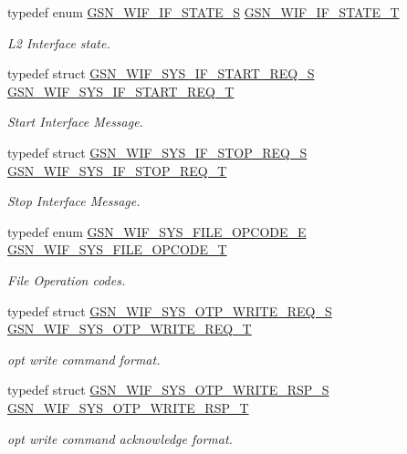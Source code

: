 \begin{DoxyCompactItemize}
typedef enum \hyperlink{a00639_ga5b5ea6b444509449484db8bf22612b98}{GSN\_\-WIF\_\-IF\_\-STATE\_\-S} \hyperlink{a00639_ga7ff7134a0bdba9e91d4edf9cea797de7}{GSN\_\-WIF\_\-IF\_\-STATE\_\-T}
\begin{DoxyCompactList}\small\item\em L2 Interface state. \end{DoxyCompactList}\item 
typedef struct \hyperlink{a00353}{GSN\_\-WIF\_\-SYS\_\-IF\_\-START\_\-REQ\_\-S} \hyperlink{a00639_gae60d074a50101f9b50a01707e3d4f437}{GSN\_\-WIF\_\-SYS\_\-IF\_\-START\_\-REQ\_\-T}
\begin{DoxyCompactList}\small\item\em Start Interface Message. \end{DoxyCompactList}\item 
typedef struct \hyperlink{a00355}{GSN\_\-WIF\_\-SYS\_\-IF\_\-STOP\_\-REQ\_\-S} \hyperlink{a00639_ga1e2d9e30a2dac9894c1d8c54d6b2b68e}{GSN\_\-WIF\_\-SYS\_\-IF\_\-STOP\_\-REQ\_\-T}
\begin{DoxyCompactList}\small\item\em Stop Interface Message. \end{DoxyCompactList}\item 
typedef enum \hyperlink{a00639_ga24ebbde6925db9b03e4648c99be320b4}{GSN\_\-WIF\_\-SYS\_\-FILE\_\-OPCODE\_\-E} \hyperlink{a00639_ga87b927b7d702c16024b46557013dbb64}{GSN\_\-WIF\_\-SYS\_\-FILE\_\-OPCODE\_\-T}
\begin{DoxyCompactList}\small\item\em File Operation codes. \end{DoxyCompactList}\item 
typedef struct \hyperlink{a00360}{GSN\_\-WIF\_\-SYS\_\-OTP\_\-WRITE\_\-REQ\_\-S} \hyperlink{a00639_gaa1cf18e499f7fd325969144c10fdd54a}{GSN\_\-WIF\_\-SYS\_\-OTP\_\-WRITE\_\-REQ\_\-T}
\begin{DoxyCompactList}\small\item\em opt write command format. \end{DoxyCompactList}\item 
typedef struct \hyperlink{a00361}{GSN\_\-WIF\_\-SYS\_\-OTP\_\-WRITE\_\-RSP\_\-S} \hyperlink{a00639_gac6f93d0889c0fdbf82aa2e0af7c0d988}{GSN\_\-WIF\_\-SYS\_\-OTP\_\-WRITE\_\-RSP\_\-T}
\begin{DoxyCompactList}\small\item\em opt write command acknowledge format. \end{DoxyCompactList}\item 

\end{DoxyCompactItemize}

